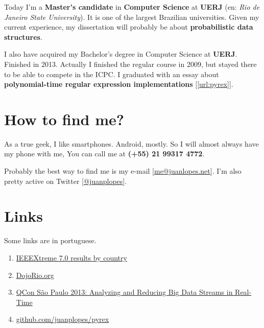 \documentclass[a4paper,12pt,oneside]{article}
\begin{document}
	Today I'm a \textbf{Master's candidate} in \textbf{Computer Science} at
	\textbf{UERJ} (en: \emph{Rio de Janeiro State University}). It is one of the
	largest Brazilian universities. Given my current experience, my dissertation
	will probably be about \textbf{probabilistic data structures}.

	I also have acquired my Bachelor's degree in Computer Science at \textbf{UERJ}.
	Finished in 2013. Actually I finished the regular course in 2009, but stayed
	there to be able to compete in the ICPC. I graduated with an essay about
	\textbf{polynomial-time regular expression implementations} [\ref{url:pyrex}].

\section*{How to find me?}

	As a true geek, I like smartphones. Android, mostly. So I will almost always
	have my phone with me, You can call me at \textbf{(+55) 21 99317 4772}.

	Probably the best way to find me is my e-mail
	[\href{mailto:me@juanlopes.net}{me@juanlopes.net}]. I'm also pretty active on
	Twitter [\href{http://twitter.com/juanplopes}{@juanplopes}].

\section*{Links}

	Some links are in portuguese.

\begin{enumerate}

  \item \label{url:ieeextreme} \href{http://www.ieee.org/membership_services/membership/students/competitions/xtreme/xtreme7_final_rankings-country.pdf}{IEEEXtreme 7.0 results by country}
  \item \label{url:dojorio} \href{http://dojorio.org/}{DojoRio.org}
  \item \label{url:qconsp2013} \href{http://www.infoq.com/br/presentations/analisando-fluxo-dados-tempo-real}{QCon São Paulo 2013: Analyzing and Reducing Big Data Streams in Real-Time}
  \item \label{url:pyrex} \href{http://github.com/juanplopes/pyrex}{github.com/juanplopes/pyrex}
\end{enumerate}
\end{document}
